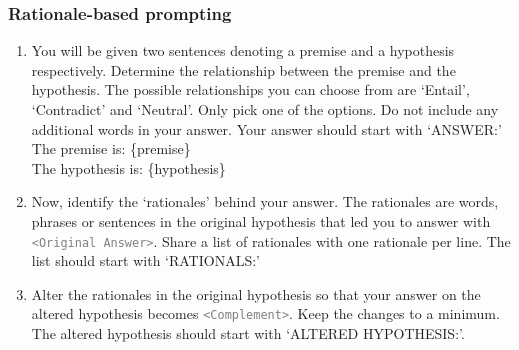 \subsubsection{Rationale-based prompting}
\begin{enumerate}
    \item You will be given two sentences denoting a premise and a hypothesis respectively. Determine the relationship between the premise and the hypothesis. The possible relationships you can choose from are `Entail', `Contradict' and `Neutral'. Only pick one of the options. Do not include any additional words in your answer. Your answer should start with `ANSWER:'\\
    The premise is: \{premise\}\\
    The hypothesis is: \{hypothesis\}\\
    \item Now, identify the `rationales' behind your answer. The rationales are words, phrases or sentences in the original hypothesis that led you to answer with \textcolor{gray}{\texttt{<Original Answer>}}. Share a list of rationales with one rationale per line. The list should start with `RATIONALS:'
    \item Alter the rationales in the original hypothesis so that your answer on the altered hypothesis becomes \textcolor{gray}{\texttt{<Complement>}}. Keep the changes to a minimum. The altered hypothesis should start with `ALTERED HYPOTHESIS:'.
    \end{enumerate}


